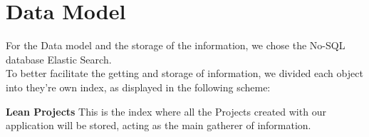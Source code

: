\documentclass[a4paper,twoside,10pt]{report}
\begin{document}
\section{Data Model}
For the Data model and the storage of the information, we chose the No-SQL database Elastic Search.
\\ \newline
To better facilitate the getting and storage of information, we divided each object into they're own index, as displayed in the following scheme:
\begin{center}
\end{center}
\textbf{Lean Projects}
\newline
This is the index where all the Projects created with our application will be stored, acting as the main gatherer of information.
\end{document}
